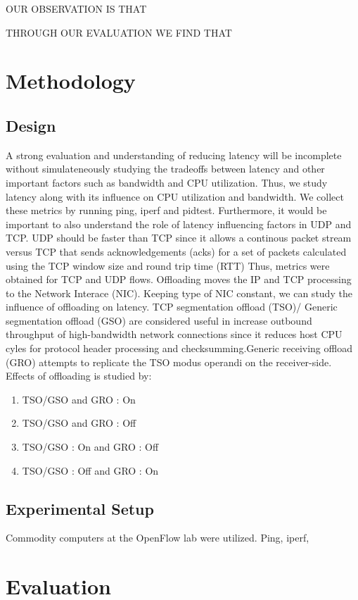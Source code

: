 OUR OBSERVATION IS THAT

THROUGH OUR EVALUATION WE FIND THAT

\section{Methodology}
\subsection{Design}
A strong evaluation and understanding of reducing latency will be incomplete
without simulateneously studying the tradeoffs between latency and other
important factors such as bandwidth and CPU utilization. Thus, we study latency
along with its influence on CPU utilization and bandwidth. We
collect these metrics by running ping, iperf and pidtest. Furthermore, it would be 
important to also understand the role of latency influencing factors in UDP and
TCP. UDP should be faster than TCP since it allows a continous packet stream versus TCP that sends acknowledgements (acks) for a set of packets calculated using the TCP window size and round trip time (RTT) Thus, metrics were obtained for TCP 
and UDP flows. 
Offloading moves the IP and TCP processing to the Network Interace (NIC).
Keeping type of NIC constant, we can study the influence of offloading on
latency. TCP segmentation offload (TSO)/ Generic segmentation offload (GSO) are
 considered useful in increase outbound  throughput of high-bandwidth network 
connections since it reduces host CPU cyles for protocol header processing and checksumming.Generic receiving offload (GRO) attempts to replicate the TSO modus operandi on
the receiver-side. Effects of offloading is studied by:

\begin{enumerate}
\item TSO/GSO and GRO : On
\item TSO/GSO and GRO : Off
\item TSO/GSO : On and GRO : Off
\item TSO/GSO : Off and GRO : On 
\end{enumerate} 

\subsection{Experimental Setup}
Commodity computers at the OpenFlow lab were utilized. Ping, iperf, 

\section{Evaluation}
